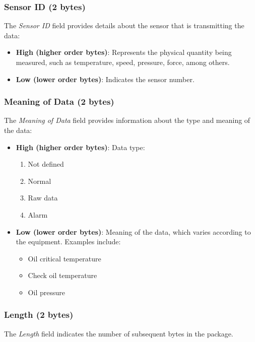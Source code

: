 \subsubsection{Sensor ID (2 bytes)}

The \textit{Sensor ID} field provides details about the sensor that is transmitting the data:

\begin{itemize}
    \item \textbf{High (higher order bytes)}: Represents the physical quantity being measured, such as temperature, speed, pressure, force, among others.
    \item \textbf{Low (lower order bytes)}: Indicates the sensor number.
\end{itemize}\subsubsection{Meaning of Data (2 bytes)}

The \textit{Meaning of Data} field provides information about the type and meaning of the data:

\begin{itemize}
    \item \textbf{High (higher order bytes)}: Data type:
    \begin{enumerate}
        \item Not defined
        \item Normal
        \item Raw data
        \item Alarm
    \end{enumerate}
    \item \textbf{Low (lower order bytes)}: Meaning of the data, which varies according to the equipment. Examples include:
    \begin{itemize}
        \item Oil critical temperature
        \item Check oil temperature
        \item Oil pressure
\end{itemize}
\end{itemize}

\subsubsection{Length (2 bytes)}

The \textit{Length} field indicates the number of subsequent bytes in the package.

